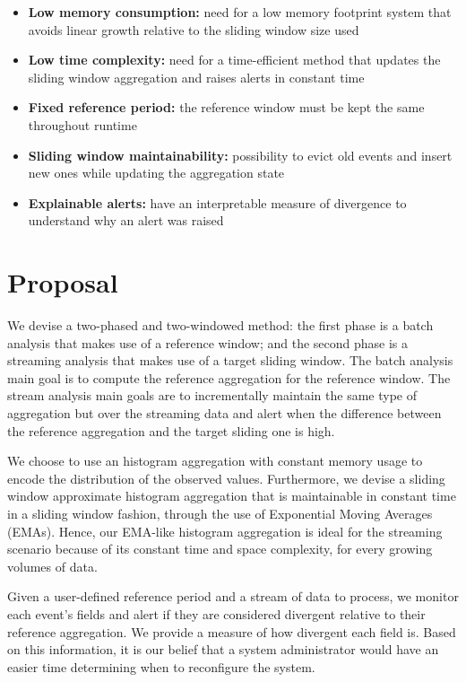 \begin{itemize}
    \item \textbf{Low memory consumption:} need for a low memory footprint system that avoids linear growth relative to the sliding window size used
    
    \item \textbf{Low time complexity:} need for a time-efficient method that updates the sliding window aggregation and raises alerts in constant time
    
    \item \textbf{Fixed reference period:} the reference window must be kept the same throughout runtime
    
    \item \textbf{Sliding window maintainability:} possibility to evict old events and insert new ones while updating the aggregation state
    
    \item \textbf{Explainable alerts:} have an interpretable measure of divergence to understand why an alert was raised
\end{itemize}


\section{Proposal}
We devise a two-phased and two-windowed method: the first phase is a batch analysis that makes use of a reference window; and the second phase is a streaming analysis that makes use of a target sliding window. The batch analysis main goal is to compute the reference aggregation for the reference window. The stream analysis main goals are to incrementally maintain the same type of aggregation but over the streaming data and alert when the difference between the reference aggregation and the target sliding one is high.

We choose to use an histogram aggregation with constant memory usage to encode the distribution of the observed values. Furthermore, we devise a sliding window approximate histogram aggregation that is maintainable in constant time in a sliding window fashion, through the use of Exponential Moving Averages (EMAs). Hence, our EMA-like histogram aggregation is ideal for the streaming scenario because of its constant time and space complexity, for every growing volumes of data.

Given a user-defined reference period and a stream of data to process, we monitor each event's fields and alert if they are considered divergent relative to their reference aggregation. We provide a measure of how divergent each field is. Based on this information, it is our belief that a system administrator would have an easier time determining when to reconfigure the system.

